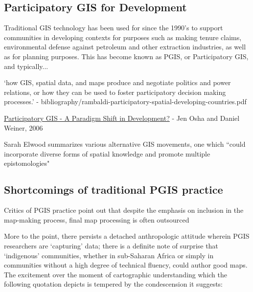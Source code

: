 \documentclass[11pt]{report}
\begin{document}
\subsection{Participatory GIS for Development}
\label{subsec:pgis}

Traditional GIS technology has been used for since the 1990's to support communities in developing contexts for purposes such as making tenure claims, environmental defense against petroleum and other extraction industries, as well as for planning purposes. This has become known as PGIS, or Participatory GIS, and typically... 


`how GIS, spatial data, and maps produce and negotiate politics and power relations, or how they can be used to foster participatory decision making processes.' -  bibliography/rambaldi-participatory-spatial-developing-countries.pdf


\href{http://www.directionsmag.com/article.php?article_id=2365&trv=1.}{Participatory GIS - A Paradigm Shift in Development?} - Jen Osha and Daniel Weiner, 2006

Sarah Elwood summarizes various alternative GIS movements, one which ``could incorporate diverse forms of spatial knowledge and promote multiple epistomologies" \cite{elwood2009representations}

\subsection{Shortcomings of traditional PGIS practice}
\label{subsec:pgisshortcomings}

Critics of PGIS practice point out that despite the emphasis on inclusion in the map-making process, final map processing is often outsourced

More to the point, there persists a detached anthropologic attitude wherein PGIS researchers are `capturing' data; there is a definite note of surprise that `indigenous' communities, whether in sub-Saharan Africa or simply in communities without a high degree of technical fluency, could author good maps. The excitement over the moment of cartographic understanding which the following quotation depicts is tempered by the condescension it suggests: 
\end{document}
